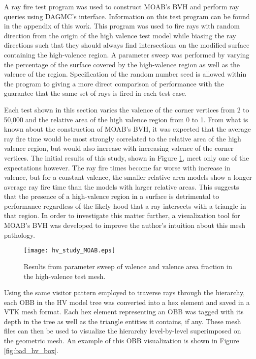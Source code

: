 A ray fire test program was used to construct MOAB's BVH and perform ray queries
using DAGMC's interface. Information on this test program can be found in the
appendix of this work. This program was used to fire rays with random direction
from the origin of the high valence test model while biasing the
ray directions such that they should always find intersections on the modified surface
containing the high-valence region. A parameter sweep was performed by varying
the percentage of the surface covered by the high-valence region as well as the
valence of the region. Specification of the random number seed is allowed within
the program to giving a more direct comparison of performance with the guarantee
that the same set of rays is fired in each test case.

Each test shown in this section varies the valence of the corner vertices from 2
to 50,000 and the relative area of the high valence region from 0 to 1. From
what is known about the construction of MOAB's BVH, it was expected that the
average ray fire time would be most strongly correlated to the relative area of
the high valence region, but would also increase with increasing valence of the
corner vertices. The initial results of this study, shown in
Figure \ref{fig:hv_study_moab}, meet only one of the expectations however. The
ray fire times become far worse with increase in valence, but for a constant
valence, the smaller relative area models show a longer average ray fire time than
the models with larger relative areas. This suggests that the presence of a
high-valence region in a surface is detrimental to performance regardless of the
likely hood that a ray intersects with a triangle in that region. In order to
investigate this matter further, a visualization tool for MOAB's BVH was
developed to improve the author's intuition about this mesh pathology.

\begin{figure}[H]
  \centering
    \texttt{[image: hv\_study\_MOAB.eps]}
    \caption{Results from parameter sweep of valence and valence area fraction in the high-valence test mesh.}
    \label{fig:hv_study_moab}
\end{figure}

Using the same visitor pattern employed to traverse rays through the hierarchy,
each OBB in the HV model tree was converted into a hex element and saved in a
VTK mesh format. Each hex element representing an OBB was tagged with its
depth in the tree as well as the triangle entities it contains, if any. These
mesh files can then be used to visualize the hierarchy level-by-level
superimposed on the geometric mesh. An example of this OBB visualization is
shown in Figure \ref{fig:bad_hv_box}. 

